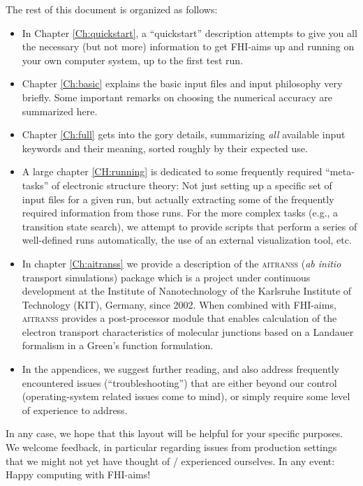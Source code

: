 The rest of this document is organized as follows:
\begin{itemize}
  \item In Chapter \ref{Ch:quickstart}, a ``quickstart'' 
    description attempts to give you all the necessary
    (but not more) information to get FHI-aims up and running on your own
    computer system, up to the first test run.
  \item Chapter \ref{Ch:basic} explains the basic input files and input
    philosophy very briefly. Some important remarks on choosing the numerical
    accuracy are summarized here.
  \item Chapter \ref{Ch:full} gets into the gory details, summarizing
    \emph{all} available input keywords and their meaning, sorted roughly by
    their expected use. 
  \item A large chapter \ref{CH:running} is dedicated to some frequently required
    ``meta-tasks'' of electronic structure theory: Not just setting up a
    specific set of input files for a given run, but actually extracting some
    of the frequently required information from those runs. For the more
    complex tasks (e.g., a transition state search), we attempt to provide
    scripts that perform a series of well-defined runs automatically, the 
    use of an external visualization tool, etc. 
  \item In chapter \ref{Ch:aitranss} we provide a description of the 
    \textsc{aitranss} ({\it ab initio} transport simulations) package which is
    a project under continuous development at the Institute of Nanotechnology  
    of the Karlsruhe Institute of Technology (KIT), Germany, since 2002. 
    When combined with FHI-aims, \textsc{aitranss} provides a
    post-processor module that enables calculation of the electron
    transport characteristics of molecular junctions based on a Landauer  
    formalism in a Green's function formulation.
  \item In the appendices, we suggest further reading, and also address
    frequently encountered issues (``troubleshooting'') that are either beyond
    our control (operating-system related issues come to mind), or simply
    require some level of experience to address.  
\end{itemize}
In any case, we hope that this layout will be helpful for your specific
purposes. We welcome feedback, in particular regarding issues from
production settings that we might not yet have thought of / experienced
ourselves. In any event: Happy computing with FHI-aims! 

